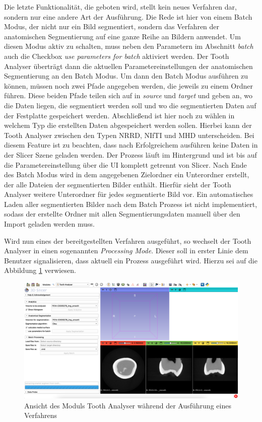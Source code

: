 Die letzte Funktionalität, die geboten wird, stellt kein neues Verfahren dar, sondern
nur eine andere Art der Ausführung. Die Rede ist hier von einem Batch Modus, der
nicht nur ein Bild segmentiert, sondern das Verfahren der anatomischen
Segmentierung auf eine ganze Reihe an Bildern anwendet. Um diesen Modus aktiv zu
schalten, muss neben den Parametern im Abschnitt \textit{batch} auch die Checkbox
\textit{use parameters for batch} aktiviert werden. Der Tooth Analyser überträgt
dann die aktuellen Parametereinstellungen der anatomischen Segmentierung an den Batch
Modus. Um dann den Batch Modus ausführen zu können, müssen noch zwei Pfade angegeben
werden, die jeweils zu einem Ordner führen. Diese beiden Pfade teilen sich auf in
\textit{source} und \textit{target} und geben an, wo die Daten liegen, die segmentiert
werden soll und wo die segmentierten Daten auf der Festplatte gespeichert werden.
Abschließend ist hier noch zu wählen in welchem Typ die erstellten Daten
abgespeichert werden sollen. Hierbei kann der Tooth Analyser zwischen den Typen \ac{NRRD},
\ac{NIfTI} und \ac{MHD} unterscheiden. Bei diesem Feature ist zu beachten, dass nach
Erfolgreichem ausführen keine Daten in der Slicer Szene geladen werden. Der
Prozess läuft im Hintergrund und ist bis auf die Parametereinstellung über die
\ac{UI} komplett getrennt von Slicer. Nach Ende des Batch Modus wird in dem
angegebenen Zielordner ein Unterordner erstellt, der alle Dateien der segmentierten
Bilder enthält. Hierfür sieht der Tooth Analyser weitere Unterordner für jedes
segmentierte Bild vor. Ein automatisches Laden aller segmentierten Bilder nach dem
Batch Prozess ist nicht implementiert, sodass der erstellte Ordner mit allen
Segmentierungsdaten manuell über den Import geladen werden muss.

Wird nun eines der bereitgestellten Verfahren ausgeführt, so wechselt der Tooth Analyser
in einen sogenannten \textit{Processing Mode}. Dieser soll in erster Linie dem Benutzer
signalisieren, dass aktuell ein Prozess ausgeführt wird. Hierzu sei auf die Abbildung
\ref{fig:processing_mode} verwiesen.

\begin{figure}[h]
	\centering
	\includegraphics[scale=1, width=\textwidth]{img/processingMode.png}
	\caption{Ansicht des Moduls Tooth Analyser während der Ausführung eines
	Verfahrens}
	\label{fig:processing_mode}
\end{figure}

